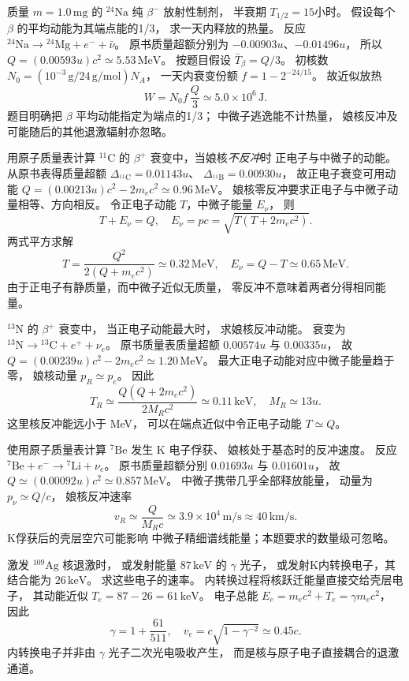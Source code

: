 质量 $m=1.0\,\mathrm{mg}$ 的
$\mathrm{^{24}Na}$ 纯 $\beta^-$ 放射性制剂，
半衰期 $T_{1/2}=15$小时。
假设每个 $\beta$ 的平均动能为其端点能的1/3，
求一天内释放的热量。
\exsolution
反应
$\mathrm{^{24}Na}\to\mathrm{^{24}Mg}+e^-+\bar\nu$。
原书质量超额分别为
$-0.00903u$、$-0.01496u$，
所以
$Q=(0.00593u)c^2\simeq5.53\,\mathrm{MeV}$。
按题目假设
$\bar T_\beta=Q/3$。
初核数
$N_0=(10^{-3}\,\mathrm g/24\,\mathrm{g/mol})N_A$，
一天内衰变份额
$f=1-2^{-24/15}$。
故近似放热
\[
 \boxed{W=N_0 f\,\frac Q3
 \simeq5.0\times10^6\,\mathrm J}.
\]
\excheck 题目明确把 $\beta$ 平均动能指定为端点的1/3；
中微子逃逸能不计热量，
娘核反冲及可能随后的其他退激辐射亦忽略。

用原子质量表计算 $\mathrm{^{11}C}$ 的
$\beta^+$ 衰变中，当娘核\emph{不反冲}时
正电子与中微子的动能。
\exsolution
从原书表得质量超额
$\Delta_{\mathrm{^{11}C}}=0.01143u$、
$\Delta_{\mathrm{^{11}B}}=0.00930u$，
故正电子衰变可用动能
$Q=(0.00213u)c^2-2m_ec^2\simeq0.96\,\mathrm{MeV}$。
娘核零反冲要求正电子与中微子动量相等、方向相反。
令正电子动能 $T$，中微子能量 $E_\nu$，
则
\[
 T+E_\nu=Q,\quad
 E_\nu=pc=\sqrt{T(T+2m_ec^2)}.
\]
两式平方求解
\[
 \boxed{T=\frac{Q^2}{2(Q+m_ec^2)}
 \simeq0.32\,\mathrm{MeV}},
 \quad
 \boxed{E_\nu=Q-T\simeq0.65\,\mathrm{MeV}}.
\]
\excheck 由于正电子有静质量，而中微子近似无质量，
零反冲不意味着两者分得相同能量。

$\mathrm{^{13}N}$ 的 $\beta^+$ 衰变中，
当正电子动能最大时，
求娘核反冲动能。
\exsolution
衰变为 $\mathrm{^{13}N}\to
\mathrm{^{13}C}+e^++\nu_e$。
原书质量表质量超额
$0.00574u$ 与 $0.00335u$，
故
$Q=(0.00239u)c^2-2m_ec^2
 \simeq1.20\,\mathrm{MeV}$。
最大正电子动能对应中微子能量趋于零，
娘核动量 $p_R\simeq p_e$。
因此
\[
 \boxed{T_R\simeq
 \frac{Q(Q+2m_ec^2)}{2M_Rc^2}
 \simeq0.11\,\mathrm{keV}},
 \quad M_R\simeq13u.
\]
\excheck 这里核反冲能远小于 MeV，
可以在端点近似中令正电子动能 $T\simeq Q$。

使用原子质量表计算
$\mathrm{^{7}Be}$ 发生 K 电子俘获、
娘核处于基态时的反冲速度。
\exsolution
反应
$\mathrm{^{7}Be}+e^-\to\mathrm{^{7}Li}+\nu_e$。
原书质量超额分别
$0.01693u$ 与 $0.01601u$，
故 $Q\simeq(0.00092u)c^2
 \simeq0.857\,\mathrm{MeV}$。
中微子携带几乎全部释放能量，
动量为 $p_\nu\simeq Q/c$，
娘核反冲速率
\[
 \boxed{v_R\simeq\frac{Q}{M_Rc}
 \simeq3.9\times10^4\,\mathrm{m/s}
 \approx40\,\mathrm{km/s}}.
\]
\excheck K俘获后的壳层空穴可能影响
中微子精细谱线能量；本题要求的数量级可忽略。

激发 $\mathrm{^{109}Ag}$ 核退激时，
或发射能量 $87\,\mathrm{keV}$ 的 $\gamma$ 光子，
或发射K内转换电子，其结合能为
$26\,\mathrm{keV}$。
求这些电子的速率。
\exsolution
内转换过程将核跃迁能量直接交给壳层电子，
其动能近似
$T_e=87-26=61\,\mathrm{keV}$。
电子总能
$E_e=m_ec^2+T_e=\gamma m_ec^2$，
因此
\[
 \gamma=1+\frac{61}{511},\quad
 \boxed{v_e=c\sqrt{1-\gamma^{-2}}
 \simeq0.45c}.
\]
\excheck 内转换电子并非由 $\gamma$ 光子二次光电吸收产生，
而是核与原子电子直接耦合的退激通道。

